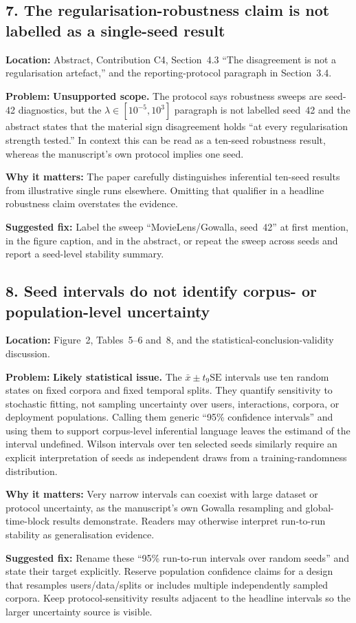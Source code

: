 \documentclass[11pt]{article}
\newcommand{\loc}[1]{\par\noindent\textbf{Location:} #1\par}
\newcommand{\problem}[1]{\noindent\textbf{Problem:} #1\par}
\newcommand{\impact}[1]{\noindent\textbf{Why it matters:} #1\par}
\newcommand{\fix}[1]{\noindent\textbf{Suggested fix:} #1\par}
\begin{document}
\subsection*{7. The regularisation-robustness claim is not labelled as a single-seed result}

\loc{Abstract, Contribution C4, Section~4.3 ``The disagreement is not a regularisation artefact,'' and the reporting-protocol paragraph in Section~3.4.}
\problem{\textbf{Unsupported scope.} The protocol says robustness sweeps are seed-42 diagnostics, but the $\lambda\in[10^{-5},10^3]$ paragraph is not labelled seed~42 and the abstract states that the material sign disagreement holds ``at every regularisation strength tested.''  In context this can be read as a ten-seed robustness result, whereas the manuscript's own protocol implies one seed.}
\impact{The paper carefully distinguishes inferential ten-seed results from illustrative single runs elsewhere.  Omitting that qualifier in a headline robustness claim overstates the evidence.}
\fix{Label the sweep ``MovieLens/Gowalla, seed~42'' at first mention, in the figure caption, and in the abstract, or repeat the sweep across seeds and report a seed-level stability summary.}

\subsection*{8. Seed intervals do not identify corpus- or population-level uncertainty}

\loc{Figure~2, Tables~5--6 and~8, and the statistical-conclusion-validity discussion.}
\problem{\textbf{Likely statistical issue.} The $\bar{x}\pm t_9\mathrm{SE}$ intervals use ten random states on fixed corpora and fixed temporal splits.  They quantify sensitivity to stochastic fitting, not sampling uncertainty over users, interactions, corpora, or deployment populations.  Calling them generic ``95\% confidence intervals'' and using them to support corpus-level inferential language leaves the estimand of the interval undefined.  Wilson intervals over ten selected seeds similarly require an explicit interpretation of seeds as independent draws from a training-randomness distribution.}
\impact{Very narrow intervals can coexist with large dataset or protocol uncertainty, as the manuscript's own Gowalla resampling and global-time-block results demonstrate.  Readers may otherwise interpret run-to-run stability as generalisation evidence.}
\fix{Rename these ``95\% run-to-run intervals over random seeds'' and state their target explicitly.  Reserve population confidence claims for a design that resamples users/data/splits or includes multiple independently sampled corpora.  Keep protocol-sensitivity results adjacent to the headline intervals so the larger uncertainty source is visible.}
\end{document}
